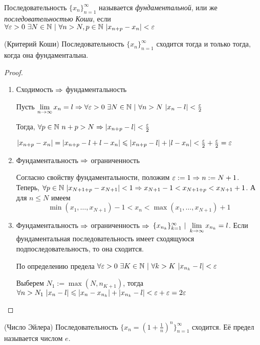 \begin{definition}
	Последовательность $\{x_n\}_{n = 1}^\infty$ называется \textit{фундаментальной}, или же \textit{последовательностью Коши}, если $\forall \varepsilon > 0\ \exists N \in \mathbb{N}\ |\ \forall n > N, p \in \mathbb{N}\ |x_{n + p} - x_n| < \varepsilon$
\end{definition}

\begin{theorem} (Критерий Коши)
	Последовательность $\{x_n\}_{n = 1}^\infty$ сходится тогда и только тогда, когда она фундаментальна. 
\end{theorem}

\begin{proof}
	\begin{enumerate}
		\item Сходимость $\Rightarrow$ фундаментальность
		
		Пусть $\lim\limits_{n \rightarrow \infty} x_n = l \Rightarrow \forall \varepsilon > 0\ \exists N \in \mathbb{N}\ |\ \forall n > N\ |x_n - l| < \frac{\varepsilon}{2}$
		
		Тогда, $\forall p \in \mathbb{N}\ n + p > N \Rightarrow |x_{n + p} - l| < \frac{\varepsilon}{2}$
		
		$|x_{n + p} - x_n| = |x_{n + p} - l + l - x_n| \leqslant |x_{n + p} - l| + |l - x_n| < \frac{\varepsilon}{2} + \frac{\varepsilon}{2} = \varepsilon$
		
		\item Фундаментальность $\Rightarrow$ ограниченность
		
		Согласно свойству фундаментальности, положим $\varepsilon := 1 \Rightarrow n := N + 1$. Теперь, $\forall p \in \mathbb{N}\ |x_{N + 1 + p} - x_{N + 1}| < 1 \Rightarrow x_{N + 1} - 1 < x_{N + 1 + p} < x_{N + 1} + 1$. А для $n \le N$ имеем
		$$
			\min(x_1, \dots, x_{N + 1}) - 1 < x_n < \max(x_1, \dots, x_{N + 1}) + 1
 		$$
 		
 		\item Фундаментальность $\Rightarrow$ ограниченность $\Rightarrow$ $\{x_{n_k}\}_{k = 1}^\infty\ |\ \lim\limits_{k \rightarrow \infty} x_{n_k} = l$. Если фундаментальная последовательность имеет сходящуюся подпоследовательность, то она сходится.
 		
 		По определению предела $\forall \varepsilon > 0\ \exists K \in \mathbb{N}\ |\ \forall k > K\ |x_{n_k} - l| < \varepsilon$
 		
 		Выберем $N_1 := \max(N, n_{K + 1})$, тогда $\forall n > N_1 \ |x_n - l| \leqslant |x_n - x_{n_k}| + |x_{n_k} - l| < \varepsilon + \varepsilon = 2\varepsilon$
	\end{enumerate}
\end{proof}

\begin{theorem} (Число Эйлера)
	Последовательность $\{x_n = (1 + \frac{1}{n})^n\}_{n = 1}^\infty$ сходится. Её предел называется числом $e$.
\end{theorem}

